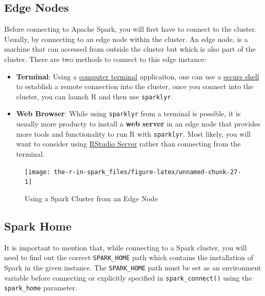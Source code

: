 \documentclass[]{book}
\providecommand{\tightlist}{%
  \setlength{\itemsep}{0pt}\setlength{\parskip}{0pt}}
\theoremstyle{definition}
\theoremstyle{definition}
\theoremstyle{definition}
\theoremstyle{remark}
\begin{document}
\hypertarget{edge-nodes}{%
\subsection{Edge Nodes}\label{edge-nodes}}

Before connecting to Apache Spark, you will first have to connect to the
cluster. Usually, by connecting to an edge node within the cluster. An
edge node, is a machine that can accessed from outside the cluster but
which is also part of the cluster. There are two methods to connect to
this edge instance:

\begin{itemize}
\tightlist
\item
  \textbf{Terminal}: Using a
  \href{https://en.wikipedia.org/wiki/Computer_terminal}{computer
  terminal} applicaiton, one can use a
  \href{https://en.wikipedia.org/wiki/Secure_Shell}{secure shell} to
  establish a remote connection into the cluster, once you connect into
  the cluster, you can launch R and then use \texttt{sparklyr}.
\item
  \textbf{Web Browser}: While using \texttt{sparklyr} from a terminal is
  possible, it is usually more producty to install a \textbf{web server}
  in an edge node that provides more tools and functionality to run R
  with \texttt{sparklyr}. Most likely, you will want to consider using
  \href{RStudio\%20Server}{RStudio Server} rather than connecting from
  the terminal.
\end{itemize}

\begin{figure}

{\centering \texttt{[image: the-r-in-spark\_files/figure-latex/unnamed-chunk-27-1]} 

}

\caption{Using a Spark Cluster from an Edge Node}\label{fig:unnamed-chunk-27}
\end{figure}

\hypertarget{spark-home}{%
\subsection{Spark Home}\label{spark-home}}

It is important to mention that, while connecting to a Spark cluster,
you will need to find out the correct \texttt{SPARK\_HOME} path which
contains the installation of Spark in the given instance. The
\texttt{SPARK\_HOME} path must be set as an environment variable before
connecting or explicitly specified in \texttt{spark\_connect()} using
the \texttt{spark\_home} parameter.
\end{document}
